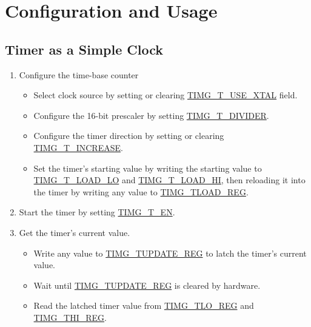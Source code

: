 \documentclass[main\_\_EN.tex]{subfiles}
\begin{document}
\section{Configuration and Usage}

\subsection{Timer as a Simple Clock}\label{sec:timg-func-descr-simple-clock}
\begin{enumerate}
    \item Configure the time-base counter
    \begin{itemize}
        \item Select clock source by setting or clearing \hyperref[fielddesc:TIMGTXUSEXTAL]{TIMG\_T\_USE\_XTAL} field.
        \item Configure the 16-bit prescaler by setting \hyperref[fielddesc:TIMGTXDIVIDER]{TIMG\_T\_DIVIDER}.
        \item Configure the timer direction by setting or clearing \hyperref[fielddesc:TIMGTXINCREASE]{TIMG\_T\_INCREASE}.
        \item Set the timer's starting value by writing the starting value to \hyperref[fielddesc:TIMGTXLOADLO]{TIMG\_T\_LOAD\_LO} and \hyperref[fielddesc:TIMGTXLOADHI]{TIMG\_T\_LOAD\_HI}, then reloading it into the timer by writing any value to \hyperref[regdesc:TIMGTXLOADREG]{TIMG\_TLOAD\_REG}.
    \end{itemize}
    \item Start the timer by setting \hyperref[fielddesc:TIMGTXEN]{TIMG\_T\_EN}.
    \item Get the timer's current value.
    \begin{itemize}
        \item  Write any value to \hyperref[regdesc:TIMGTXUPDATEREG]{TIMG\_TUPDATE\_REG} to latch the timer's current value.
        \item Wait until \hyperref[regdesc:TIMGTXUPDATEREG]{TIMG\_TUPDATE\_REG} is cleared by hardware.
        \item  Read the latched timer value from \hyperref[regdesc:TIMGTXLOREG]{TIMG\_TLO\_REG} and \hyperref[regdesc:TIMGTXHIREG]{TIMG\_THI\_REG}.
    \end{itemize}
\end{enumerate}
\end{document}
